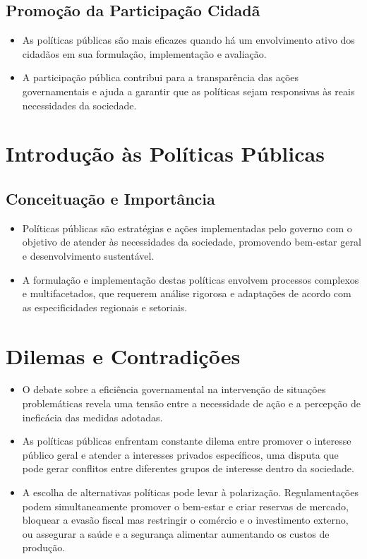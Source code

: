 \documentclass[
   article,       
   12pt,          
   oneside,       
   a4paper,       
   english,       
   brazil,        
   sumario=tradicional
   ]{abntex2}
\begin{document}
\subsection{Promoção da Participação Cidadã}
\begin{itemize}
    \item As políticas públicas são mais eficazes quando há um envolvimento ativo dos cidadãos em sua formulação, implementação e avaliação.
    \item A participação pública contribui para a transparência das ações governamentais e ajuda a garantir que as políticas sejam responsivas às reais necessidades da sociedade.
\end{itemize}
\section{Introdução às Políticas Públicas}
\subsection{Conceituação e Importância}
\begin{itemize}
\item Políticas públicas são estratégias e ações implementadas pelo governo com o objetivo de atender às necessidades da sociedade, promovendo bem-estar geral e desenvolvimento sustentável.
\item A formulação e implementação destas políticas envolvem processos complexos e multifacetados, que requerem análise rigorosa e adaptações de acordo com as especificidades regionais e setoriais.
\end{itemize}

\section{Dilemas e Contradições}
\begin{itemize}
\item O debate sobre a eficiência governamental na intervenção de situações problemáticas revela uma tensão entre a necessidade de ação e a percepção de ineficácia das medidas adotadas.
\item As políticas públicas enfrentam constante dilema entre promover o interesse público geral e atender a interesses privados específicos, uma disputa que pode gerar conflitos entre diferentes grupos de interesse dentro da sociedade.
\item A escolha de alternativas políticas pode levar à polarização. Regulamentações podem simultaneamente promover o bem-estar e criar reservas de mercado, bloquear a evasão fiscal mas restringir o comércio e o investimento externo, ou assegurar a saúde e a segurança alimentar aumentando os custos de produção.
\end{itemize}
\end{document}
